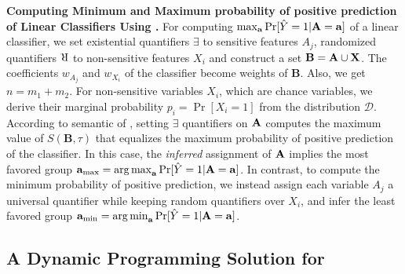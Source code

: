\textbf{Computing Minimum and Maximum probability of positive prediction of Linear Classifiers Using  {\stochastic}.} For computing $ \max_{ \mathbf{a}} \Pr[\hat{Y} =1 | \mathbf{A} = \mathbf{a}] $ of a linear classifier, we set existential quantifiers $ \exists $ to sensitive features $ A_j $, randomized quantifiers $ \R $ to non-sensitive features $ X_i $ and construct a set $ \mathbf{B} = \mathbf{A} \cup \mathbf{X} $.  The coefficients $ w_{A_j} $ and $ w_{X_i} $ of the classifier become weights of $ \mathbf{B} $. Also, we get $n=m_1 +m_2$. For non-sensitive variables $ X_i $, which are chance variables, we derive their marginal probability $ p_i = \Pr[X_i = 1] $ from the distribution $ \mathcal{D} $.  According to semantic of {\stochastic}, setting $ \exists $ quantifiers on $ \mathbf{A} $ computes the maximum value of $ S(\mathbf{B}, \tau) $ that equalizes the maximum probability of positive prediction of the classifier. In this case, the \textit{inferred} assignment of $ \mathbf{A} $ implies the most favored group $ \mathbf{a}_{{\max}} =  \operatorname*{arg\,max}_{ \mathbf{a}} \Pr[\hat{Y} =1 | \mathbf{A} = \mathbf{a}] $. In contrast, to compute the minimum probability of positive prediction, we instead assign each variable  $ A_j $ a universal  quantifier  while keeping random quantifiers over $ X_i $, and infer the least favored group $ \mathbf{a}_{{\min}} =  \operatorname*{arg\,min}_{ \mathbf{a}} \Pr[\hat{Y} =1 | \mathbf{A} = \mathbf{a}] $.

\iffalse
\red{The decision version of computing the maximum (minimum) \red{\red{probability of positive prediction}} is to decide whether there is an assignment of \textit{sensitive} or \textit{choice variables}, for which the \textit{non-sensitive} or \textit{chance variables} yield a \red{\red{probability of positive prediction}} greater or less than $\alpha \in [0,1]$. Now, we formally state the hardness of verifying linear classifiers followed by an efficient dynamic programming solution.
\begin{lemma}
	\label{fvgm_lm:hardness}
	The decision version of the fairness verification problem for linear classifiers is in $\mathrm{NP^{PP}}$.
\end{lemma}}
\fi

 
 
 \subsection{A Dynamic Programming Solution for {\stochastic}}
 \label{fvgm_sec:dp_formulation}

